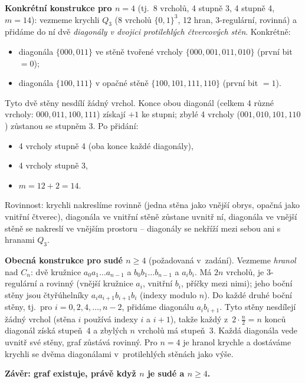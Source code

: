 \documentclass[11pt,a4paper]{article}
\begin{document}
\begin{priklad}
\begin{enumerate}[label=(\arabic*)]
  \medskip\noindent\textbf{Konkrétní konstrukce pro $n=4$} (tj.\ 8 vrcholů, 4 stupně 3, 4 stupně 4, $m=14$): vezmeme krychli $Q_3$ (8 vrcholů $\{0,1\}^3$, 12 hran, 3-regulární, rovinná) a přidáme do ní dvě \emph{diagonály v dvojici protilehlých čtvercových stěn}. Konkrétně:
  \begin{itemize}
    \item diagonála $\{000,011\}$ ve stěně tvořené vrcholy $\{000,001,011,010\}$ (první bit $=0$);
    \item diagonála $\{100,111\}$ v opačné stěně $\{100,101,111,110\}$ (první bit $=1$).
  \end{itemize}
  Tyto dvě stěny nesdílí žádný vrchol. Konce obou diagonál (celkem 4 různé vrcholy: $000,011,100,111$) získají $+1$ ke stupni; zbylé 4 vrcholy ($001,010,101,110$) zůstanou se stupněm 3. Po přidání:
  \begin{itemize}
    \item 4 vrcholy stupně 4 (oba konce každé diagonály),
    \item 4 vrcholy stupně 3,
    \item $m=12+2=14$.
  \end{itemize}
  Rovinnost: krychli nakreslíme rovinně (jedna stěna jako vnější obrys, opačná jako vnitřní čtverec), diagonála ve vnitřní stěně zůstane uvnitř ní, diagonála ve vnější stěně se nakreslí ve vnějším prostoru -- diagonály se nekříží mezi sebou ani s hranami $Q_3$.

  \medskip\noindent\textbf{Obecná konstrukce pro sudé $n\ge 4$} (požadovaná v~zadání). Vezmeme \emph{hranol} nad $C_n$: dvě kružnice $a_0a_1\dots a_{n-1}$ a $b_0b_1\dots b_{n-1}$ a  $a_ib_i$. Má $2n$ vrcholů, je 3-regulární a rovinný (vnější kružnice $a_i$, vnitřní $b_i$, příčky mezi nimi); jeho boční stěny jsou čtyřúhelníky $a_ia_{i+1}b_{i+1}b_i$ (indexy modulo $n$). Do každé druhé boční stěny, tj.\ pro $i=0,2,4,\dots,n-2$, přidáme diagonálu $a_ib_{i+1}$. Tyto stěny nesdílejí žádný vrchol (stěna $i$ používá indexy $i$ a $i+1$), takže každý z~$2\cdot\frac n2=n$ konců diagonál získá stupeň~4 a zbylých $n$ vrcholů má stupeň~3. Každá diagonála vede uvnitř své stěny, graf zůstává rovinný. Pro $n=4$ je hranol krychle a dostáváme krychli se dvěma diagonálami v~protilehlých stěnách jako výše.

  \textbf{Závěr: graf existuje, právě když $n$ je sudé a $n\ge 4$.}
\end{enumerate}
\end{priklad}

\end{document}
